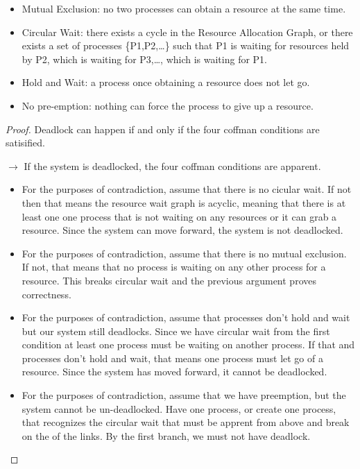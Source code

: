 \begin{itemize}
\tightlist
\item
  \gls{Mutual Exclusion}: no two processes can obtain a resource at the same time.
\item
  \gls{Circular Wait}: there exists a cycle in the Resource Allocation Graph, or there exists a set of processes \{P1,P2,\ldots{}\} such that P1 is waiting for resources held by P2, which is waiting for P3,\ldots{}, which is waiting for P1.
\item
  \gls{Hold and Wait}: a process once obtaining a resource does not let go.
\item
  \gls{No pre-emption}: nothing can force the process to give up a resource.
\end{itemize}

\begin{proof} Deadlock can happen if and only if the four coffman conditions are satisified.

$\rightarrow$ If the system is deadlocked, the four coffman conditions are apparent.

\begin{itemize}
\item For the purposes of contradiction, assume that there is no cicular wait. If not then that means the resource wait graph is acyclic, meaning that there is at least one one process that is not waiting on any resources or it can grab a resource. Since the system can move forward, the system is not deadlocked.
\item For the purposes of contradiction, assume that there is no mutual exclusion. If not, that means that no process is waiting on any other process for a resource. This breaks circular wait and the previous argument proves correctness.
\item For the purposes of contradiction, assume that processes don't hold and wait but our system still deadlocks. Since we have circular wait from the first condition at least one process must be waiting on another process. If that and processes don't hold and wait, that means one process must let go of a resource. Since the system has moved forward, it cannot be deadlocked.
\item For the purposes of contradiction, assume that we have preemption, but the system cannot be un-deadlocked. Have one process, or create one process, that recognizes the circular wait that must be apprent from above and break on the of the links. By the first branch, we must not have deadlock.
\end{itemize}


\end{proof}
